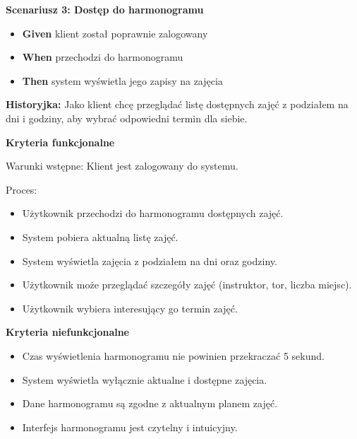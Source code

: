 \documentclass[a4paper,12pt]{article}
\begin{document}
\textbf{Scenariusz 3: Dostęp do harmonogramu}
\begin{itemize}
    \item \textbf{Given} klient został poprawnie zalogowany
    \item \textbf{When} przechodzi do harmonogramu
    \item \textbf{Then} system wyświetla jego zapisy na zajęcia
\end{itemize}

\vspace{0,5cm}

\noindent \textbf{Historyjka:} Jako klient chcę przeglądać listę dostępnych zajęć z podziałem na dni i godziny, aby wybrać odpowiedni termin dla siebie.

\vspace{0,2cm}

\noindent \textbf{Kryteria funkcjonalne}

\vspace{0,2cm}

\noindent Warunki wstępne: Klient jest zalogowany do systemu.

\vspace{0,2cm}

\noindent Proces:

\begin{itemize}
    \item Użytkownik przechodzi do harmonogramu dostępnych zajęć.
    \item System pobiera aktualną listę zajęć.
    \item System wyświetla zajęcia z podziałem na dni oraz godziny.
    \item Użytkownik może przeglądać szczegóły zajęć (instruktor, tor, liczba miejsc).
    \item Użytkownik wybiera interesujący go termin zajęć.
\end{itemize}

\noindent \textbf{Kryteria niefunkcjonalne}
\begin{itemize}
    \item Czas wyświetlenia harmonogramu nie powinien przekraczać 5 sekund.
    \item System wyświetla wyłącznie aktualne i dostępne zajęcia.
    \item Dane harmonogramu są zgodne z aktualnym planem zajęć.
    \item Interfejs harmonogramu jest czytelny i intuicyjny.
\end{itemize}
\end{document}
